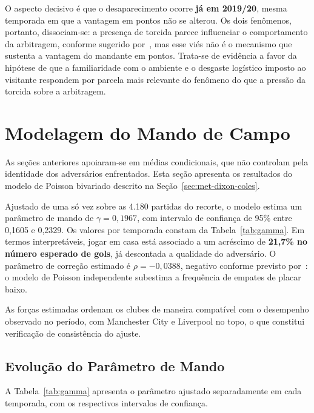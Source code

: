O aspecto decisivo é que o desaparecimento ocorre \textbf{já em 2019/20}, mesma
temporada em que a vantagem em pontos não se alterou. Os dois fenômenos, portanto,
dissociam-se: a presença de torcida parece influenciar o comportamento da
arbitragem, conforme sugerido por~, mas esse viés não é o
mecanismo que sustenta a vantagem do mandante em pontos. Trata-se de evidência a
favor da hipótese de que a familiaridade com o ambiente e o desgaste logístico
imposto ao visitante respondem por parcela mais relevante do fenômeno do que a
pressão da torcida sobre a arbitragem.

\section{Modelagem do Mando de Campo}\label{sec:res-modelo}

As seções anteriores apoiaram-se em médias condicionais, que não controlam pela
identidade dos adversários enfrentados. Esta seção apresenta os resultados do
modelo de Poisson bivariado descrito na Seção~\ref{sec:met-dixon-coles}.

Ajustado de uma só vez sobre as 4.180 partidas do recorte, o modelo estima um
parâmetro de mando de $\gamma = 0{,}1967$, com intervalo de confiança de 95\%
entre 0,1605 e 0,2329. Os valores por temporada constam da
Tabela~\ref{tab:gamma}.
Em termos interpretáveis, jogar em casa está associado a um acréscimo de
\textbf{21,7\% no número esperado de gols}, já descontada a qualidade do
adversário. O parâmetro de correção estimado é $\rho = -0{,}0388$, negativo
conforme previsto por~: o modelo de Poisson
independente subestima a frequência de empates de placar baixo.

As forças estimadas ordenam os clubes de maneira compatível com o desempenho
observado no período, com Manchester City e Liverpool no topo, o que constitui
verificação de consistência do ajuste.

\subsection{Evolução do Parâmetro de Mando}\label{sec:res-gamma-temporal}

A Tabela~\ref{tab:gamma} apresenta o parâmetro ajustado separadamente em cada
temporada, com os respectivos intervalos de confiança.

\begin{table}[htb]
  \centering
  \caption{Parâmetro de mando de campo ajustado, por temporada.}
  \label{tab:gamma}
  \small
  
\end{table}

